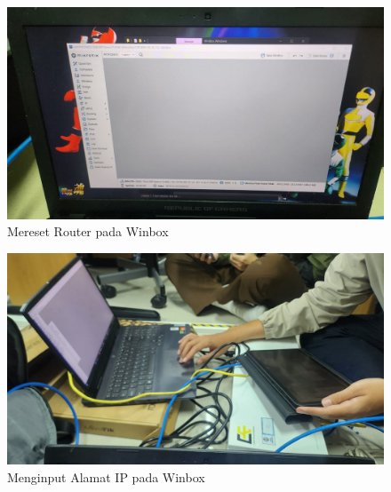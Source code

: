     \begin{figure}[H]
        \centering
        \includegraphics[width=0.5\linewidth]{3.jpeg}
        \caption{Mereset Router pada Winbox}
        \label{fig:gambar1}
    \end{figure}

    \begin{figure}[H]
        \centering
        \includegraphics[width=0.5\linewidth]{4.jpeg}
        \caption{Menginput Alamat IP pada Winbox}
        \label{fig:gambar1}
    \end{figure}
    


